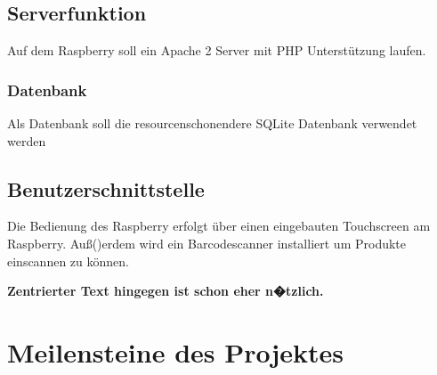 \documentclass[11pt,a4paper]{article} %
\begin{document}
\subsection{Serverfunktion}
Auf dem Raspberry soll ein Apache 2 Server mit PHP Unterst\"utzung laufen.
\subsubsection{Datenbank}
Als Datenbank soll die resourcenschonendere SQLite Datenbank verwendet werden

\subsection{Benutzerschnittstelle}
Die Bedienung des Raspberry erfolgt \"uber einen eingebauten Touchscreen am Raspberry. Au\ss()erdem wird ein Barcodescanner installiert um Produkte einscannen zu k\"onnen.

\begin{center}
\begin{large}
\textbf{Zentrierter Text hingegen ist schon eher n�tzlich.}
\end{large}
\end{center}


\section{Meilensteine des Projektes}
\label{Umbrueche}
\end{document}
